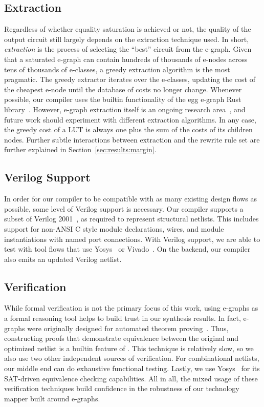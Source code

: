 \subsection{Extraction}\label{sec:flow:extraction}
Regardless of whether equality saturation is achieved or not, the quality of
the output circuit still largely depends on the extraction technique used. In
short, \textit{extraction} is the process of selecting the ``best'' circuit
from the e-graph. Given that a saturated e-graph can contain hundreds of
thousands of e-nodes across tens of thousands of e-classes, a greedy extraction
algorithm is the most pragmatic. The greedy extractor iterates over the
e-classes, updating the cost of the cheapest e-node until the database of costs
no longer change. Whenever possible, our compiler uses the builtin
functionality of the egg e-graph Rust library~\cite{docsEgg}. However, e-graph
extraction itself is an ongoing research area~\cite{smoothe,
    sparsextract,esynth}, and future work should experiment with different
extraction algorithms. In any case, the greedy cost of a LUT is always one plus
the sum of the costs of its children nodes. Further subtle interactions between
extraction and the rewrite rule set are further explained in
Section~\ref{sec:results:margin}.

\subsection{Verilog Support}\label{sec:flow:verilog}
In order for our compiler to be compatible with as many existing design flows
as possible, some level of Verilog support is necessary. Our compiler supports
a subset of Verilog 2001~\cite{verilog}, as required to represent structural
netlists. This includes support for non-ANSI C style module declarations,
wires, and module instantiations with named port connections. With Verilog
support, we are able to test \shortname{} with tool flows that use
Yosys~\cite{yosys} or Vivado~\cite{vivado}. On the backend, our compiler also
emits an updated Verilog netlist.

\subsection{Verification}\label{sec:flow:verification}
While formal verification is not the primary focus of this work, using e-graphs
as a formal reasoning tool helps to build trust in our synthesis results. In
fact, e-graphs were originally designed for automated theorem
proving~\cite{eggpaper}. Thus, constructing proofs that demonstrate equivalence
between the original and optimized netlist is a builtin feature of
\shortname{}. This technique is relatively slow, so we also use two other
independent sources of verification. For combinational netlists, our middle end
can do exhaustive functional testing. Lastly, we use Yosys~\cite{yosys} for its
SAT-driven equivalence checking capabilities. All in all, the mixed usage of
these verification techniques build confidence in the robustness of our
technology mapper built around e-graphs.